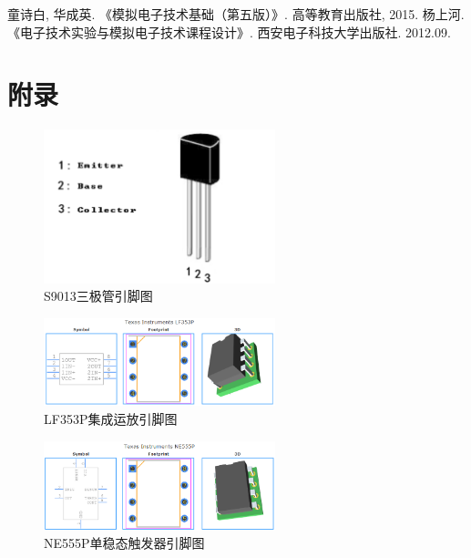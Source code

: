 \documentclass[12pt]{article}
\begin{document}
\newpage
\nocite{*}

\begin{thebibliography}{99}

    童诗白, 华成英. 《模拟电子技术基础（第五版）》. 高等教育出版社, 2015.
    杨上河. 《电子技术实验与模拟电子技术课程设计》. 西安电子科技大学出版社. 2012.09.

\end{thebibliography}

\newpage
\section*{附录}

\begin{figure}[htbp]
    \centering
    \includegraphics[width=0.6\textwidth]{fig/S9013.png}
    \caption{S9013三极管引脚图}
    \label{fig:S9013}
\end{figure}

\begin{figure}[htbp]
    \centering
    \includegraphics[width=0.6\textwidth]{fig/LF353P.png}
    \caption{LF353P集成运放引脚图}
    \label{fig:LF353P}
\end{figure}

\begin{figure}[htbp]
    \centering
    \includegraphics[width=0.6\textwidth]{fig/NE555P.png}
    \caption{NE555P单稳态触发器引脚图}
    \label{fig:NE555P}
\end{figure}
\end{document}
